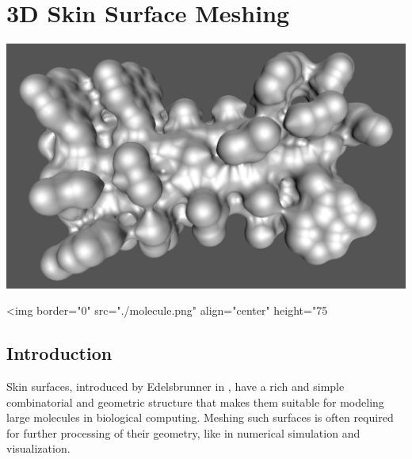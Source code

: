
\newcommand{\dabs}[1]{{\parallel\! #1 \!\parallel}}

\chapter{3D Skin Surface Meshing}
\label{chapter_SkinSurface}

\minitoc

\begin{ccTexOnly}
\begin{center}
\includegraphics[width=.9\textwidth]{Skin_surface_3/molecule}
\end{center}
\end{ccTexOnly}
\begin{ccHtmlOnly}
<img border="0" src="./molecule.png" align="center" height="75%
\end{ccHtmlOnly}

\section{Introduction}
\label{sectionSkinSurfaceIntro}

Skin surfaces, introduced by Edelsbrunner in \cite{cgal:e-dssd-99},
have a rich and simple combinatorial and geometric structure that
makes them suitable for modeling large molecules in biological
computing.  Meshing such surfaces is often required for further
processing of their geometry, like in numerical simulation and
visualization.

